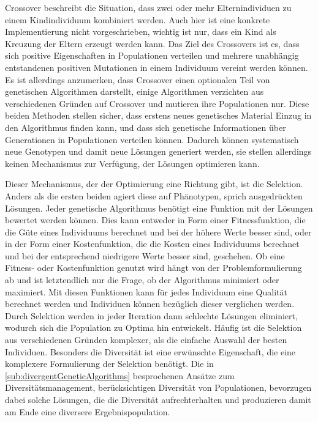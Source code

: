 Crossover beschreibt die Situation, dass zwei oder mehr Elternindividuen zu einem Kindindividuum kombiniert werden. 
Auch hier ist eine konkrete Implementierung nicht vorgeschrieben, wichtig ist nur, dass ein Kind als Kreuzung der Eltern erzeugt werden kann.
Das Ziel des Crossovers ist es, dass sich positive Eigenschaften in Populationen verteilen und mehrere unabhängig entstandenen positiven Mutationen in einem Individuum vereint werden können.
Es ist allerdings anzumerken, dass Crossover einen optionalen Teil von genetischen Algorithmen darstellt, einige Algorithmen%
verzichten aus verschiedenen Gründen auf Crossover und mutieren ihre Populationen nur.
Diese beiden Methoden stellen sicher, dass erstens neues genetisches Material Einzug in den Algorithmus finden kann, und dass sich genetische Informationen über Generationen in Populationen verteilen können.
Dadurch können systematisch neue Genotypen und damit neue Lösungen generiert werden, sie stellen allerdings keinen Mechanismus zur Verfügung, der Lösungen optimieren kann.

Dieser Mechanismus, der der Optimierung eine Richtung gibt, ist die Selektion.
Anders als die ersten beiden agiert diese auf Phänotypen, sprich ausgedrückten Lösungen.
Jeder genetische Algorithmus benötigt eine Funktion mit der Lösungen bewertet werden können.
Dies kann entweder in Form einer Fitnessfunktion, die die Güte eines Individuums berechnet und bei der höhere Werte besser sind, oder in der Form einer Kostenfunktion, die die Kosten eines Individuums berechnet und bei der entsprechend niedrigere Werte besser sind, geschehen.
Ob eine Fitness- oder Kostenfunktion genutzt wird hängt von der Problemformulierung ab und ist letztendlich nur die Frage, ob der Algorithmus minimiert oder maximiert.
Mit diesen Funktionen kann für jedes Individuum eine Qualität berechnet werden und Individuen können bezüglich dieser verglichen werden.
Durch Selektion werden in jeder Iteration dann schlechte Lösungen eliminiert, wodurch sich die Population zu Optima hin entwickelt.
Häufig ist die Selektion aus verschiedenen Gründen komplexer, als die einfache Auswahl der besten Individuen.
Besonders die Diversität ist eine erwünschte Eigenschaft, die eine komplexere Formulierung der Selektion benötigt.
Die in \cref{sub:divergentGeneticAlgorithms} besprochenen Ansätze zum Diversitätsmanagement, berücksichtigen Diversität von Populationen, bevorzugen dabei solche Lösungen, die die Diversität aufrechterhalten und produzieren damit am Ende eine diversere Ergebnispopulation.

